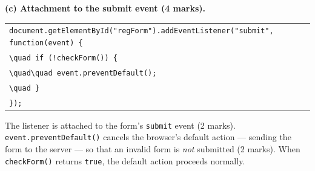 \documentclass[11pt]{article}
\begin{document}
\begin{corrige}
\textbf{(c) Attachment to the submit event (4 marks).}
\begin{center}
\begin{tabular}{l}
\texttt{document.getElementById("regForm").addEventListener("submit", function(event) \{}\\
\texttt{\textbackslash{}quad if (!checkForm()) \{}\\
\texttt{\textbackslash{}quad\textbackslash{}quad event.preventDefault();}\\
\texttt{\textbackslash{}quad \}}\\
\texttt{\});}
\end{tabular}
\end{center}
The listener is attached to the form's \texttt{submit} event (2 marks). \texttt{event.preventDefault()} cancels the browser's default action --- sending the form to the server --- so that an invalid form is \emph{not} submitted (2 marks). When \texttt{checkForm()} returns \texttt{true}, the default action proceeds normally.
\end{corrige}
\end{document}
